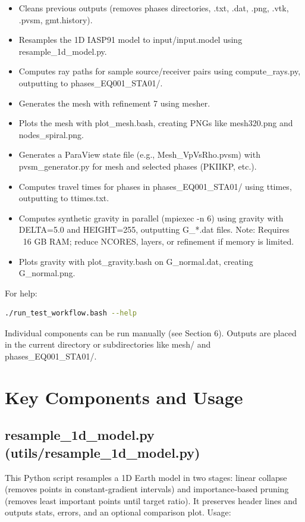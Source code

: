 \documentclass[12pt,a4paper]{article}
\begin{document}
\begin{itemize}
    \item Cleans previous outputs (removes phases directories, .txt, .dat, .png, .vtk, .pvsm, gmt.history).
    \item Resamples the 1D IASP91 model to input/input.model using resample\_1d\_model.py.
    \item Computes ray paths for sample source/receiver pairs using compute\_rays.py, outputting to phases\_EQ001\_STA01/.
    \item Generates the mesh with refinement 7 using mesher.
    \item Plots the mesh with plot\_mesh.bash, creating PNGs like mesh320.png and nodes\_spiral.png.
    \item Generates a ParaView state file (e.g., Mesh\_VpVsRho.pvsm) with pvsm\_generator.py for mesh and selected phases (PKIIKP, etc.).
    \item Computes travel times for phases in phases\_EQ001\_STA01/ using ttimes, outputting to ttimes.txt.
    \item Computes synthetic gravity in parallel (mpiexec -n 6) using gravity with DELTA=5.0 and HEIGHT=255, outputting G\_*.dat files. Note: Requires ~16 GB RAM; reduce NCORES, layers, or refinement if memory is limited.
    \item Plots gravity with plot\_gravity.bash on G\_normal.dat, creating G\_normal.png.
\end{itemize}

For help:

\begin{lstlisting}[language=Bash]
./run_test_workflow.bash --help
\end{lstlisting}

Individual components can be run manually (see Section 6). Outputs are placed in the current directory or subdirectories like mesh/ and phases\_EQ001\_STA01/.

\section{Key Components and Usage}
\subsection{resample\_1d\_model.py (utils/resample\_1d\_model.py)}
This Python script resamples a 1D Earth model in two stages: linear collapse (removes points in constant-gradient intervals) and importance-based pruning (removes least important points until target ratio). It preserves header lines and outputs stats, errors, and an optional comparison plot.
Usage:
\end{document}
